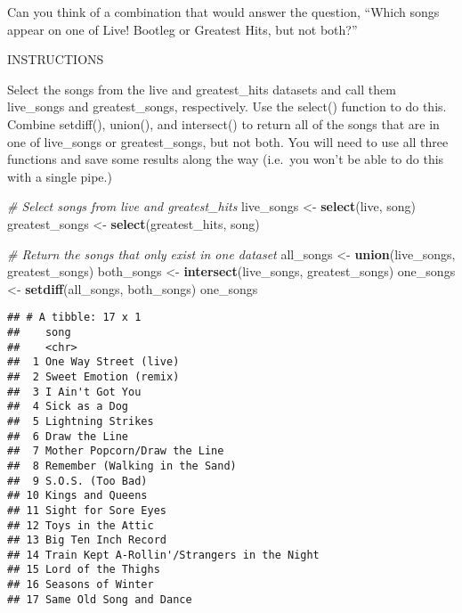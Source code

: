 \documentclass[]{article}
\newenvironment{Shaded}{\begin{snugshade}}{\end{snugshade}}
\newcommand{\KeywordTok}[1]{\textcolor[rgb]{0.13,0.29,0.53}{\textbf{#1}}}
\newcommand{\StringTok}[1]{\textcolor[rgb]{0.31,0.60,0.02}{#1}}
\newcommand{\CommentTok}[1]{\textcolor[rgb]{0.56,0.35,0.01}{\textit{#1}}}
\newcommand{\NormalTok}[1]{#1}
\begin{document}
Can you think of a combination that would answer the question, ``Which
songs appear on one of Live! Bootleg or Greatest Hits, but not both?''

INSTRUCTIONS

Select the songs from the live and greatest\_hits datasets and call them
live\_songs and greatest\_songs, respectively. Use the select() function
to do this. Combine setdiff(), union(), and intersect() to return all of
the songs that are in one of live\_songs or greatest\_songs, but not
both. You will need to use all three functions and save some results
along the way (i.e.~you won't be able to do this with a single pipe.)

\begin{Shaded}
\begin{Highlighting}[]
\CommentTok{# Select songs from live and greatest_hits}
\NormalTok{live_songs <-}\StringTok{ }\KeywordTok{select}\NormalTok{(live, song)}
\NormalTok{greatest_songs <-}\StringTok{ }\KeywordTok{select}\NormalTok{(greatest_hits, song)}

\CommentTok{# Return the songs that only exist in one dataset}
\NormalTok{all_songs <-}\StringTok{ }\KeywordTok{union}\NormalTok{(live_songs, greatest_songs)}
\NormalTok{both_songs <-}\StringTok{ }\KeywordTok{intersect}\NormalTok{(live_songs, greatest_songs)}
\NormalTok{one_songs <-}\StringTok{ }\KeywordTok{setdiff}\NormalTok{(all_songs, both_songs)}
\NormalTok{one_songs}
\end{Highlighting}
\end{Shaded}

\begin{verbatim}
## # A tibble: 17 x 1
##    song                                       
##    <chr>                                      
##  1 One Way Street (live)                      
##  2 Sweet Emotion (remix)                      
##  3 I Ain't Got You                            
##  4 Sick as a Dog                              
##  5 Lightning Strikes                          
##  6 Draw the Line                              
##  7 Mother Popcorn/Draw the Line               
##  8 Remember (Walking in the Sand)             
##  9 S.O.S. (Too Bad)                           
## 10 Kings and Queens                           
## 11 Sight for Sore Eyes                        
## 12 Toys in the Attic                          
## 13 Big Ten Inch Record                        
## 14 Train Kept A-Rollin'/Strangers in the Night
## 15 Lord of the Thighs                         
## 16 Seasons of Winter                          
## 17 Same Old Song and Dance
\end{verbatim}
\end{document}
